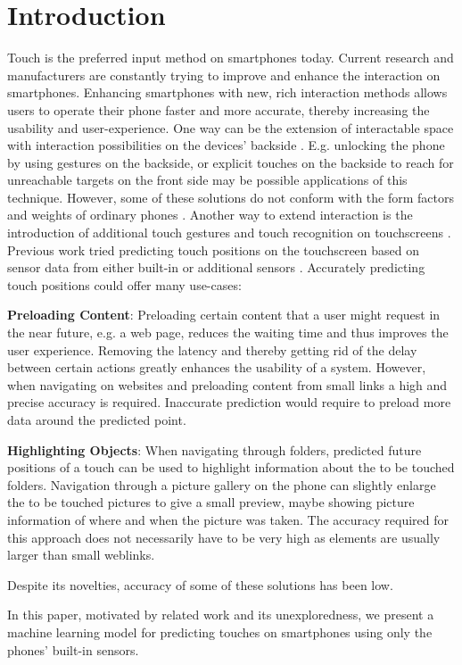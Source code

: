 \section{Introduction}
Touch is the preferred input method on smartphones today. 
Current research and manufacturers are constantly trying to improve and enhance the interaction on smartphones. 
Enhancing smartphones with new, rich interaction methods allows users to operate their phone faster and more accurate, thereby increasing the usability and user-experience.
One way can be the extension of interactable space with interaction possibilities on the devices' backside \cite{Yoo,Le2016,Baudisch2009,Le2017}.
E.g. unlocking the phone by using gestures on the backside, or explicit touches on the backside to reach for unreachable targets on the front side may be possible applications of this technique.
However, some of these solutions do not conform with the form factors and weights of ordinary phones \cite{Corsten2017,DeLuca2013,Shen,Wolf2012}.
Another way to extend interaction is the introduction of additional touch gestures and touch recognition on touchscreens \cite{Le:2018:PalmTouch, Holz2015,Guo2015}.\\
Previous work tried predicting touch positions on the touchscreen based on sensor data from either built-in or additional sensors \cite{Faizuddin2014,Le2017:Predic,MohdNoor2016}.
Accurately predicting touch positions could offer many use-cases:
\begin{description}
	\item{\textbf{Preloading Content}}: Preloading certain content that a user might request in the near future, e.g. a web page, reduces the waiting time and thus improves the user experience. 
	Removing the latency and thereby getting rid of the delay between certain actions greatly enhances the usability of a system. 
	However, when navigating on websites and preloading content from small links a high and precise accuracy is required. 
	Inaccurate prediction would require to preload more data around the predicted point.
\end{description}
\begin{description}
	\item{\textbf{Highlighting Objects}}: When navigating through folders, predicted future positions of a touch can be used to highlight information about the to be touched folders. 
	Navigation through a picture gallery on the phone can slightly enlarge the to be touched pictures to give a small preview, maybe showing picture information of where and when the picture was taken.
	The accuracy required for this approach does not necessarily have to be very high as elements are usually larger than small weblinks.
\end{description}
Despite its novelties, accuracy of some of these solutions has been low.

In this paper, motivated by related work and its unexploredness, we present a machine learning model for predicting touches on smartphones using only the phones' built-in sensors.



